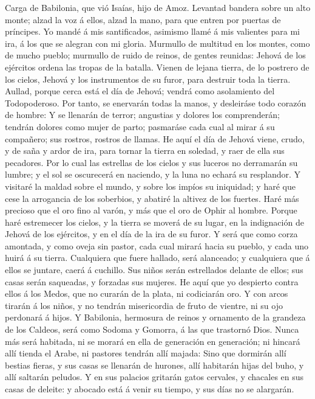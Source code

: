  Carga de Babilonia, que vió Isaías, hijo de Amoz.
 Levantad bandera sobre un alto monte; alzad la voz á
ellos, alzad la mano, para que entren por puertas de príncipes.
 Yo mandé á mis santificados, asimismo llamé á mis
valientes para mi ira, á los que se alegran con mi gloria.
 Murmullo de multitud en los montes, como de mucho pueblo;
murmullo de ruido de reinos, de gentes reunidas: Jehová de los ejércitos
ordena las tropas de la batalla.  Vienen de lejana tierra,
de lo postrero de los cielos, Jehová y los instrumentos de su furor,
para destruir toda la tierra.  Aullad, porque cerca está
el día de Jehová; vendrá como asolamiento del Todopoderoso.
 Por tanto, se enervarán todas la manos, y desleiráse todo
corazón de hombre:  Y se llenarán de terror; angustias y
dolores los comprenderán; tendrán dolores como mujer de parto; pasmaráse
cada cual al mirar á su compañero; sus rostros, rostros de llamas.
 He aquí el día de Jehová viene, crudo, y de saña y ardor
de ira, para tornar la tierra en soledad, y raer de ella sus pecadores.
 Por lo cual las estrellas de los cielos y sus luceros no
derramarán su lumbre; y el sol se oscurecerá en naciendo, y la luna no
echará su resplandor.  Y visitaré la maldad sobre el
mundo, y sobre los impíos su iniquidad; y haré que cese la arrogancia de
los soberbios, y abatiré la altivez de los fuertes.  Haré
más precioso que el oro fino al varón, y más que el oro de Ophir al
hombre.  Porque haré estremecer los cielos, y la tierra
se moverá de su lugar, en la indignación de Jehová de los ejércitos, y
en el día de la ira de su furor.  Y será que como corza
amontada, y como oveja sin pastor, cada cual mirará hacia su pueblo, y
cada uno huirá á su tierra.  Cualquiera que fuere
hallado, será alanceado; y cualquiera que á ellos se juntare, caerá á
cuchillo.  Sus niños serán estrellados delante de ellos;
sus casas serán saqueadas, y forzadas sus mujeres.  He
aquí que yo despierto contra ellos á los Medos, que no curarán de la
plata, ni codiciarán oro.  Y con arcos tirarán á los
niños, y no tendrán misericordia de fruto de vientre, ni su ojo
perdonará á hijos.  Y Babilonia, hermosura de reinos y
ornamento de la grandeza de los Caldeos, será como Sodoma y Gomorra, á
las que trastornó Dios.  Nunca más será habitada, ni se
morará en ella de generación en generación; ni hincará allí tienda el
Arabe, ni pastores tendrán allí majada:  Sino que
dormirán allí bestias fieras, y sus casas se llenarán de hurones, allí
habitarán hijas del buho, y allí saltarán peludos.  Y en
sus palacios gritarán gatos cervales, y chacales en sus casas de
deleite: y abocado está á venir su tiempo, y sus días no se alargarán.

